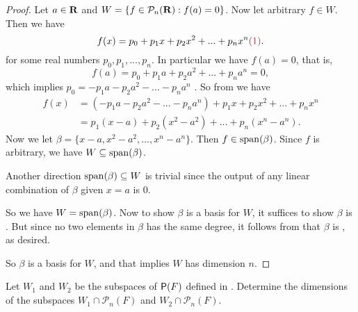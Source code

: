 \begin{proof}
Let \(a \in \mathbf{R}\) and \(W = \{ f \in \mathcal{P}_n(\mathbf{R}) : f(a) = 0 \}\).
Now let arbitrary \(f \in W\).
Then we have
\[
    f(x) = p_0 + p_1 x + p_2 x^2 + ... + p_n x^n \MAROON{(1)}.
\]
for some real numbers \(p_0, p_1, ..., p_n\).
In particular we have \(f(a) = 0\), that is,
\[
    f(a) = p_0 + p_1 a + p_2 a^2 + ... + p_n a^n = 0,
\]
which implies \(p_0 = -p_1 a - p_2 a^2 - ... - p_n a^n\) .
So from  we have
\begin{align*}
    f(x) & = (-p_1 a - p_2 a^2 - ... - p_n a^n) + p_1 x + p_2 x^2 + ... + p_n x^n \\
         & = p_1(x - a) + p_2(x^2 - a^2) + ... + p_n (x^n - a^n).
\end{align*}
Now we let \(\beta = \{ x - a, x^2 - a^2, ..., x^n - a^n \}\).
Then \(f \in \operatorname{span}(\beta)\).
Since \(f\) is arbitrary, we have \(W \subseteq \operatorname{span}(\beta)\).

Another direction \(\operatorname{span}(\beta) \subseteq W\) is trivial since the output of any linear combination of \(\beta\) given \(x = a\) is \(0\).

So we have \(W = \operatorname{span}(\beta)\).
Now to show \(\beta\) is a basis for \(W\), it suffices to show \(\beta\) is \LID{}.
But since no two elements in \(\beta\) has the same degree, it follows from  that \(\beta\) is \LID{}, as desired.

So \(\beta\) is a basis for \(W\), and that implies \(W\) has dimension \(n\).
\end{proof}

\begin{exercise} \label{exercise 1.6.27}
Let \(W_1\) and \(W_2\) be the subspaces of \(\textsf{P}(F)\) defined in .
Determine the dimensions of the subspaces \(W_1 \cap \mathcal{P}_n(F)\) and \(W_2 \cap \mathcal{P}_n(F)\).
\end{exercise}

